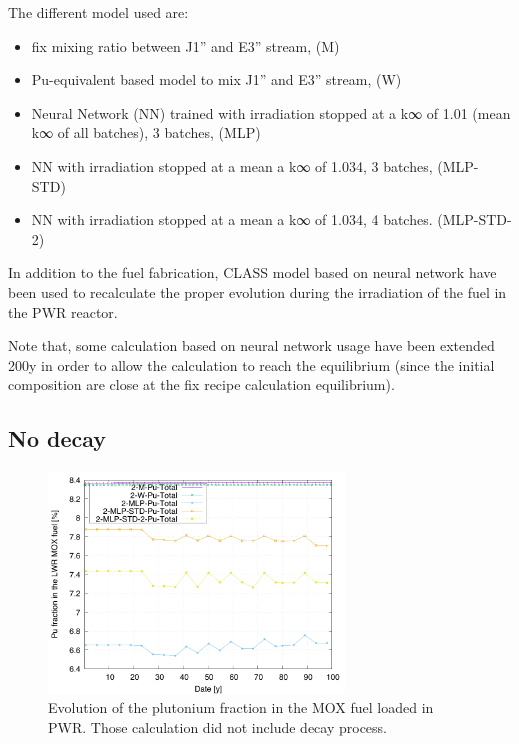 \documentclass[10pt]{article}
\begin{document}
The different model used are:
\begin{itemize}
  \item fix mixing ratio between J1'' and E3'' stream, (M)
  \item	Pu-equivalent based model to mix J1'' and E3'' stream, (W)
  \item	Neural Network (NN) trained with irradiation stopped at a k∞ of 1.01 (mean k∞ of all batches), 3 batches, (MLP)
  \item	NN with irradiation stopped at a mean a k∞ of 1.034, 3 batches, (MLP-STD)
  \item	NN with irradiation stopped at a mean a k∞ of 1.034, 4 batches. (MLP-STD-2)
\end{itemize}

In addition to the fuel fabrication, CLASS model based on neural network have
been used to recalculate the proper evolution during the irradiation of the fuel
in the PWR reactor.

Note that, some calculation based on neural network usage have been extended 200y
in order to allow the calculation to reach the equilibrium (since the initial
composition are close at the fix recipe calculation equilibrium).

\subsection{No decay}

\begin{figure}[h!]
  \centering
  \includegraphics[width=0.7\textwidth]  {img/C_1_2_MOX_pu_contribution}
  \caption{Evolution of the plutonium fraction in the MOX fuel loaded in PWR.
  Those calculation did not include decay process.}
  \label{fig:pufrac_ND}
\end{figure}
%  
%  
\end{document}
